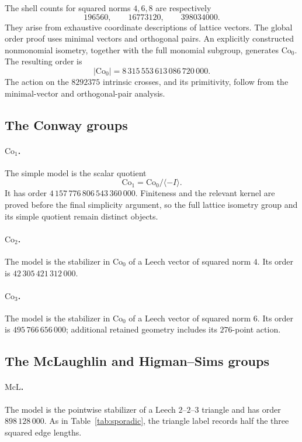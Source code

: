 \documentclass[11pt]{article}
\numberwithin{equation}{section}
\theoremstyle{definition}
\newcommand{\Co}{\mathrm{Co}}
\begin{document}
The shell counts for squared norms $4,6,8$ are respectively
\[
 196560,\qquad 16773120,\qquad 398034000.
\]
They arise from exhaustive coordinate descriptions of lattice vectors.
The global order proof uses minimal vectors and orthogonal
pairs. An explicitly constructed nonmonomial isometry, together with
the full monomial subgroup, generates $\Co_0$. The resulting order is
\[
 |\Co_0|=8\,315\,553\,613\,086\,720\,000.
\]
The action on the $8292375$ intrinsic crosses, and its primitivity,
follow from the minimal-vector and orthogonal-pair analysis.

\subsection{The Conway groups}

\paragraph{\texorpdfstring{$\Co_1$}{Co1}.}
The simple model is the scalar quotient
\[
 \Co_1=\Co_0/\langle -I\rangle.
\]
It has order $4\,157\,776\,806\,543\,360\,000$. Finiteness and the
relevant kernel are proved before the final simplicity argument,
so the full lattice isometry group and its simple quotient remain
distinct objects.

\paragraph{\texorpdfstring{$\Co_2$}{Co2}.}
The model is the stabilizer in $\Co_0$ of a Leech vector of squared
norm $4$. Its order is $42\,305\,421\,312\,000$.

\paragraph{\texorpdfstring{$\Co_3$}{Co3}.}
The model is the stabilizer in $\Co_0$ of a Leech vector of squared
norm $6$. Its order is $495\,766\,656\,000$; additional retained
geometry includes its $276$-point action.

\subsection{The McLaughlin and Higman--Sims groups}

\paragraph{\texorpdfstring{$\mathrm{McL}$}{McL}.}
The model is the pointwise stabilizer of a Leech $2$--$2$--$3$
triangle and has order $898\,128\,000$. As in
Table~\ref{tab:sporadic}, the triangle label records half the
three squared edge lengths.
\end{document}
